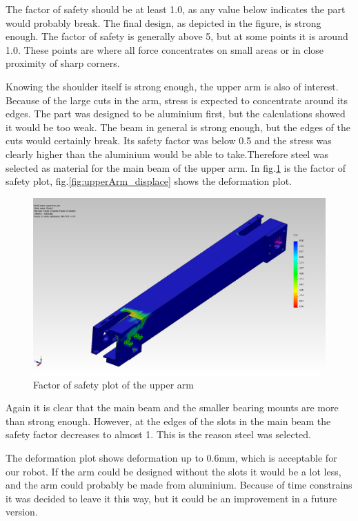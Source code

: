 \documentclass[technical_document.tex]{subfiles}
\begin{document}
The factor of safety should be at least 1.0, as any value below indicates the part would probably break. The final design, as depicted in the figure, is strong enough. The factor of safety is generally above 5, but at some points it is around 1.0. These points are where all force concentrates on small areas or in close proximity of sharp corners.

Knowing the shoulder itself is strong enough, the upper arm is also of interest. Because of the large cuts in the arm, stress is expected to concentrate around its edges. The part was designed to be aluminium first, but the calculations showed it would be too weak. The beam in general is strong enough, but the edges of the cuts would certainly break. Its safety factor was below 0.5 and the stress was clearly higher than the aluminium would be able to take.Therefore steel was selected as material for the main beam of the upper arm. In fig.\ref{fig:upperArm_FOS} is the factor of safety plot, fig.\ref{fig:upperArm_displace} shows the deformation plot.

\begin{figure}[ht!]
	\centering
	\mbox{\includegraphics[scale=0.3]{Images/upperArm_bar_FOS.jpg}}
	\caption{Factor of safety plot of the upper arm}
	\label{fig:upperArm_FOS}
\end{figure}

Again it is clear that the main beam and the smaller bearing mounts are more than strong enough. However, at the edges of the slots in the main beam the safety factor decreases to almost 1. This is the reason steel was selected.

The deformation plot shows deformation up to 0.6mm, which is acceptable for our robot. If the arm could be designed without the slots it would be a lot less, and the arm could probably be made from aluminium. Because of time constrains it was decided to leave it this way, but it could be an improvement in a future version.
\end{document}
